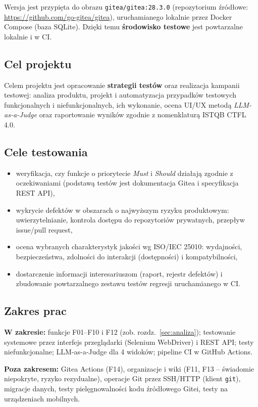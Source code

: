 \documentclass[11pt,a4paper]{article}
\begin{document}
Wersja jest przypięta do obrazu \texttt{gitea/gitea:28.3.0} (repozytorium źródłowe:
\url{https://github.com/go-gitea/gitea}), uruchamianego lokalnie przez Docker Compose
(baza SQLite). Dzięki temu \textbf{środowisko testowe} jest powtarzalne lokalnie i w CI.

\subsection{Cel projektu}
Celem projektu jest opracowanie \textbf{strategii testów} oraz realizacja kampanii testowej:
analiza produktu, projekt i automatyzacja przypadków testowych funkcjonalnych
i niefunkcjonalnych, ich wykonanie, ocena UI/UX metodą \emph{LLM-as-a-Judge} oraz
raportowanie wyników zgodnie z nomenklaturą ISTQB CTFL 4.0.

\subsection{Cele testowania}
\begin{itemize}
  \item weryfikacja, czy funkcje o priorytecie \emph{Must} i \emph{Should} działają zgodnie
        z oczekiwaniami (podstawą testów jest dokumentacja Gitea i specyfikacja REST API),
  \item wykrycie defektów w obszarach o najwyższym ryzyku produktowym: uwierzytelnianie,
        kontrola dostępu do repozytoriów prywatnych, przepływ issue/pull request,
  \item ocena wybranych charakterystyk jakości wg ISO/IEC 25010: wydajności, bezpieczeństwa,
        zdolności do interakcji (dostępności) i kompatybilności,
  \item dostarczenie informacji interesariuszom (raport, rejestr defektów) i zbudowanie
        powtarzalnego zestawu testów regresji uruchamianego w CI.
\end{itemize}

\subsection{Zakres prac}
\textbf{W zakresie:} funkcje F01--F10 i F12 (zob. rozdz.~\ref{sec:analiza}); testowanie systemowe
przez interfejs przeglądarki (Selenium WebDriver) i REST API; testy niefunkcjonalne;
LLM-as-a-Judge dla 4 widoków; pipeline CI w GitHub Actions.

\textbf{Poza zakresem:} Gitea Actions (F14), organizacje i wiki (F11, F13 -- świadomie
niepokryte, ryzyko rezydualne), operacje Git przez SSH/HTTP (klient \texttt{git}),
migracje danych, testy pielęgnowalności kodu źródłowego Gitei, testy na urządzeniach mobilnych.
\end{document}
